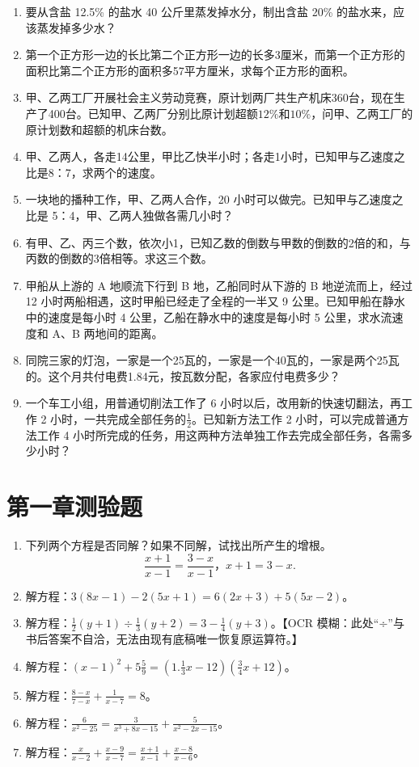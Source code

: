\begin{enumerate}[start=7]
\item
  要从含盐 12.5\% 的盐水 40 公斤里蒸发掉水分，制出含盐 20\%
  的盐水来，应该蒸发掉多少水？
\item
  第一个正方形一边的长比第二个正方形一边的长多3厘米，而第一个正方形的面积比第二个正方形的面积多57平方厘米，求每个正方形的面积。
\item
  甲、乙两工厂开展社会主义劳动竞赛，原计划两厂共生产机床360台，现在生产了400台。已知甲、乙两厂分别比原计划超额\(12\%\)和\(10\%\)，问甲、乙两工厂的原计划数和超额的机床台数。
\item
  甲、乙两人，各走14公里，甲比乙快半小时；各走1小时，已知甲与乙速度之比是8：7，求两个的速度。
\item
  一块地的播种工作，甲、乙两人合作，20
  小时可以做完。已知甲与乙速度之比是 5：4，甲、乙两人独做各需几小时？
\item
  有甲、乙、丙三个数，依次小1，已知乙数的倒数与甲数的倒数的2倍的和，与丙数的倒数的3倍相等。求这三个数。
\item
  甲船从上游的 A 地顺流下行到 B 地，乙船同时从下游的 B 地逆流而上，经过
  12 小时两船相遇，这时甲船已经走了全程的一半又 9
  公里。已知甲船在静水中的速度是每小时 4
  公里，乙船在静水中的速度是每小时 5 公里，求水流速度和 A、B
  两地间的距离。
\item
  同院三家的灯泡，一家是一个25瓦的，一家是一个40瓦的，一家是两个25瓦的。这个月共付电费1.84元，按瓦数分配，各家应付电费多少？
\item
  一个车工小组，用普通切削法工作了 6
  小时以后，改用新的快速切翻法，再工作 2
  小时，一共完成全部任务的\(\frac{1}{2}\)。已知新方法工作 2
  小时，可以完成普通方法工作 4
  小时所完成的任务，用这两种方法单独工作去完成全部任务，各需多少小时？
\end{enumerate}

\section{第一章测验题}

\begin{enumerate}
\item
  下列两个方程是否同解？如果不同解，试找出所产生的增根。
\[
\frac{x + 1}{x - 1} = \frac{3 - x}{x - 1}\text{，} x + 1 = 3 - x.
\]
\item
  解方程：\(3(8x - 1) - 2(5x + 1) = 6(2x + 3) + 5(5x - 2)\)。
\item
  解方程：\(\frac{1}{2}(y+1)\div\frac{1}{3}(y+2)=3-\frac{1}{4}(y+3)\)。【OCR
  模糊：此处``÷''与书后答案不自洽，无法由现有底稿唯一恢复原运算符。】
\item
  解方程：\((x - 1)^{2} + 5\frac{5}{9} = \left(1.\frac{1}{3} x - 12\right)\left(\frac{3}{4} x + 12\right)\)。
\item
  解方程：\(\frac{8 - x}{7 - x} + \frac{1}{x - 7} = 8\)。
\item
  解方程：\(\frac{6}{x^2 - 25} = \frac{3}{x^3 + 8x - 15} + \frac{5}{x^2 - 2x - 15}\)。
\item
  解方程：\(\frac{x}{x - 2} + \frac{x - 9}{x - 7} = \frac{x + 1}{x - 1} + \frac{x - 8}{x - 6}\)。
\end{enumerate}

